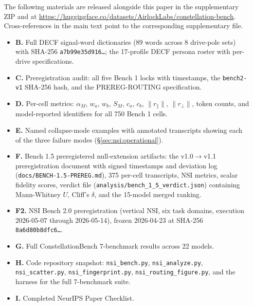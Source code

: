 \documentclass{article}
\begin{document}
The following materials are released alongside this paper in the supplementary ZIP and at \url{https://huggingface.co/datasets/AirlockLabs/constellation-bench}. Cross-references in the main text point to the corresponding supplementary file.

\begin{itemize}
\item \textbf{B.} Full DECF signal-word dictionaries (89 words across 8 drive-pole sets) with SHA-256 \texttt{a7b99e35d916\ldots}; the 17-profile DECF persona roster with per-drive specifications.
\item \textbf{C.} Preregistration audit: all five Bench 1 locks with timestamps, the \texttt{bench2-v1} SHA-256 hash, and the PREREG-ROUTING specification.
\item \textbf{D.} Per-cell metrics: $\alpha_M$, $w_a$, $w_b$, $S_M$, $c_a$, $c_b$, $\lVert r_\parallel \rVert$, $\lVert r_\perp \rVert$, token counts, and model-reported identifiers for all 750 Bench 1 cells.
\item \textbf{E.} Named collapse-mode examples with annotated transcripts showing each of the three failure modes (\S\ref{sec:nsi:operational}).
\item \textbf{F.} Bench 1.5 preregistered null-extension artifacts: the v1.0$\to$v1.1 preregistration document with signed timestamps and deviation log (\texttt{docs/BENCH-1.5-PREREG.md}), 375 per-cell transcripts, NSI metrics, scalar fidelity scores, verdict file (\texttt{analysis/bench\_1\_5\_verdict.json}) containing Mann-Whitney $U$, Cliff's $\delta$, and the 15-model merged ranking.
\item \textbf{F2.} NSI Bench 2.0 preregistration (vertical NSI, six task domains, execution 2026-05-07 through 2026-05-14), frozen 2026-04-23 at SHA-256 \texttt{8a6d80b8dfc6\ldots}.
\item \textbf{G.} Full ConstellationBench 7-benchmark results across 22 models.
\item \textbf{H.} Code repository snapshot: \texttt{nsi\_bench.py}, \texttt{nsi\_analyze.py}, \texttt{nsi\_scatter.py}, \texttt{nsi\_fingerprint.py}, \texttt{nsi\_routing\_figure.py}, and the harness for the full 7-benchmark suite.
\item \textbf{I.} Completed NeurIPS Paper Checklist.
\end{itemize}





\end{document}

